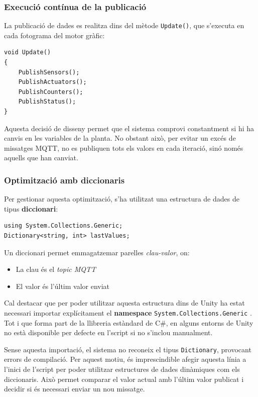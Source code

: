 \documentclass[12pt,a4paper]{report}
\begin{document}
\subsubsection{Execució contínua de la publicació}

La publicació de dades es realitza dins del mètode \texttt{Update()}, que s'executa en cada fotograma del motor gràfic:

\begin{lstlisting}[language=CSharp]
void Update()
{
    PublishSensors();
    PublishActuators();
    PublishCounters();
    PublishStatus();
}
\end{lstlisting}

Aquesta decisió de disseny permet que el sistema comprovi constantment si hi ha canvis en les variables de la planta. No obstant això, per evitar un excés de missatges MQTT, no es publiquen tots els valors en cada iteració, sinó només aquells que han canviat.

\subsubsection{Optimització amb diccionaris}

Per gestionar aquesta optimització, s'ha utilitzat una estructura de dades de tipus \textbf{diccionari}:

\begin{lstlisting}[language=CSharp]
using System.Collections.Generic;
Dictionary<string, int> lastValues;
\end{lstlisting}

Un diccionari permet emmagatzemar parelles \textit{clau-valor}, on:
\begin{itemize}
    \item La clau és el \textit{topic MQTT}
    \item El valor és l'últim valor enviat
\end{itemize}

Cal destacar que per poder utilitzar aquesta estructura dins de Unity ha estat necessari importar explícitament el \textbf{namespace} \texttt{System.Collections.Generic} \cite{dotnet_collections}. Tot i que forma part de la llibreria estàndard de C\#, en alguns entorns de Unity no està disponible per defecte en l'script si no s'inclou manualment.

Sense aquesta importació, el sistema no reconeix el tipus \texttt{Dictionary}, provocant errors de compilació. Per aquest motiu, és imprescindible afegir aquesta línia a l'inici de l'script per poder utilitzar estructures de dades dinàmiques com els diccionaris.
Això permet comparar el valor actual amb l'últim valor publicat i decidir si és necessari enviar un nou missatge.
\end{document}
